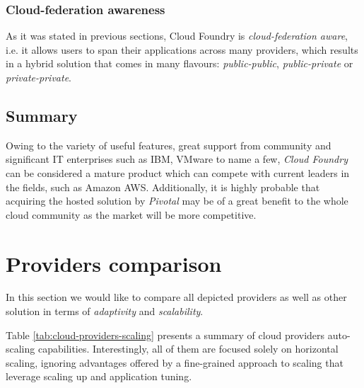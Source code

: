 \subsubsection{Cloud-federation awareness}
As it was stated in previous sections, Cloud Foundry is \emph{cloud-federation aware}, i.e. it allows users to span their applications across many providers, which results in a hybrid solution that comes in many flavours: \emph{public-public}, \emph{public-private} or \emph{private-private}.


\subsection{Summary}
Owing to the variety of useful features, great support from community and significant IT enterprises such as IBM, VMware to name a few, \emph{Cloud Foundry} can be considered a mature product which can compete with current leaders in the fields, such as Amazon AWS.
Additionally, it is highly probable that acquiring the hosted solution by \emph{Pivotal} may be of a great benefit to the whole cloud community as the market will be more competitive.

\section{Providers comparison}
In this section we would like to compare all depicted providers as well as other solution in terms of \emph{adaptivity} and \emph{scalability}.

Table \ref{tab:cloud-providers-scaling} presents a summary of cloud providers auto-scaling capabilities. Interestingly, all of them are focused solely on horizontal scaling, ignoring advantages offered by a fine-grained approach to scaling that leverage scaling up and application tuning.

